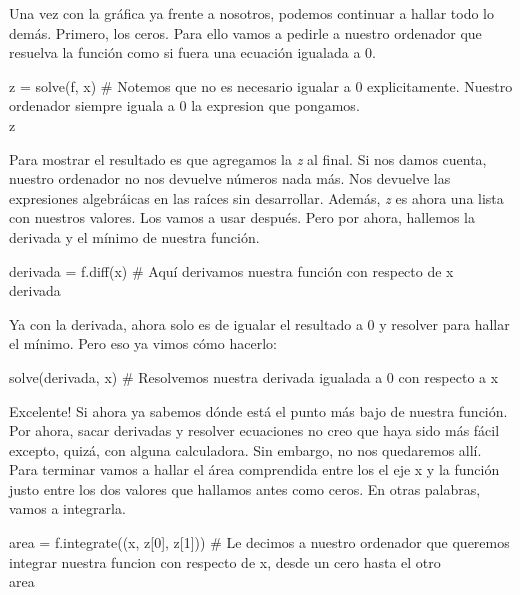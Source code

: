 \documentclass[10pt,letterpaper]{article}
\newenvironment{Code}
{
\begin{lrbox}{\selvestebox}%
\begin{minipage}{\dimexpr\columnwidth-2\fboxsep\relax}
\fontfamily{\ttdefault}\selectfont
}
{\end{minipage}\end{lrbox}%
\begin{center}
\colorbox{light-gray}{\usebox{\selvestebox}}
\end{center}
}
\begin{document}
Una vez con la gr\'afica ya frente a nosotros, podemos continuar a hallar todo lo dem\'as. Primero, los ceros. Para ello vamos a pedirle a nuestro ordenador que resuelva la funci\'on como si fuera una ecuaci\'on igualada a 0.

\begin{footnotesize}
\begin{Code}
z = solve(f, x) \# Notemos que no es necesario igualar a 0 explicitamente. Nuestro ordenador siempre iguala a 0 la expresion que pongamos.\\
z
\end{Code}
\end{footnotesize}

Para mostrar el resultado es que agregamos la \emph{z} al final. Si nos damos cuenta, nuestro ordenador no nos devuelve n\'umeros nada m\'as. Nos devuelve las expresiones algebr\'aicas en las ra\'ices sin desarrollar. Adem\'as, \emph{z} es ahora una lista con nuestros valores. Los vamos a usar despu\'es. Pero por ahora, hallemos la derivada y el m\'inimo de nuestra funci\'on.

\begin{footnotesize}
\begin{Code}
derivada = f.diff(x) \# Aqu\'i derivamos nuestra funci\'on con respecto de x\\
derivada
\end{Code}
\end{footnotesize}

Ya con la derivada, ahora solo es de igualar el resultado a 0 y resolver para hallar el m\'inimo. Pero eso ya vimos c\'omo hacerlo:

\begin{footnotesize}
\begin{Code}
solve(derivada, x) \# Resolvemos nuestra derivada igualada a 0 con respecto a x
\end{Code}
\end{footnotesize}

Excelente! Si ahora ya sabemos d\'onde est\'a el punto m\'as bajo de nuestra funci\'on. Por ahora, sacar derivadas y resolver ecuaciones no creo que haya sido m\'as f\'acil excepto, quiz\'a, con alguna calculadora. Sin embargo, no nos quedaremos all\'i. Para terminar vamos a hallar el \'area comprendida entre los el eje x y la funci\'on justo entre los dos valores que hallamos antes como ceros. En otras palabras, vamos a integrarla.

\begin{footnotesize}
\begin{Code}
area = f.integrate((x, z[0], z[1])) \# Le decimos a nuestro ordenador que queremos integrar nuestra funcion con respecto de x, desde un cero hasta el otro\\
area
\end{Code}
\end{footnotesize}
\end{document}
